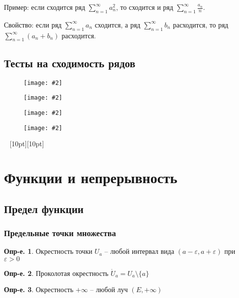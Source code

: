 \documentclass[a4paper,12pt]{article}
\numberwithin{figure}{section}
\theoremstyle{definition}
\newtheorem{definition}{Опр-е.}[section]
\theoremstyle{definition}
\def\eps{\varepsilon}
\def\ringU{\mathring{U}}
\def\vignette {\vspace{48pt} \noindent \hrulefill~ \raisebox{-8pt}[10pt][10pt]{\Huge\ding{102}}~ \hrulefill}
\newcommand\CenterFigure[2]{
	\begin{figure}[H]
		\centering
		\texttt{[image: \#2]}
	\end{figure}
}
\begin{document}
\bigbreak
Пример: если сходится ряд $\displaystyle \sum_{n=1}^{\infty}a_n^2$,
то сходится и ряд $\displaystyle \sum_{n=1}^{\infty}\frac{a_n}n$.

\bigbreak
Свойство: если ряд $\displaystyle \sum_{n=1}^{\infty}a_n$ сходится,
а ряд $\displaystyle \sum_{n=1}^{\infty}b_n$ расходится,
то ряд $\displaystyle \sum_{n=1}^{\infty} (a_n + b_n)$ расходится.


\subsection{Тесты на сходимость рядов}

\CenterFigure{\linewidth}{rows-test-1.png}

\CenterFigure{\linewidth}{rows-test-2.png}

\CenterFigure{\linewidth}{rows-test-3.png}

\CenterFigure{\linewidth}{rows-test-4.png}



\vignette
\section{Функции и непрерывность}


\subsection{Предел функции}

\subsubsection{Предельные точки множества}

\begin{definition} Окрестность точки $U_a$ -- любой интервал вида $(a-\eps,a+\eps)$ при $\eps>0$ \end{definition}

\begin{definition} Проколотая окрестность $\ringU_a = U_a \setminus \{a\}$ \end{definition}

\begin{definition} Окрестность $+\infty$ -- любой луч $(E,+\infty)$ \end{definition}
\end{document}

